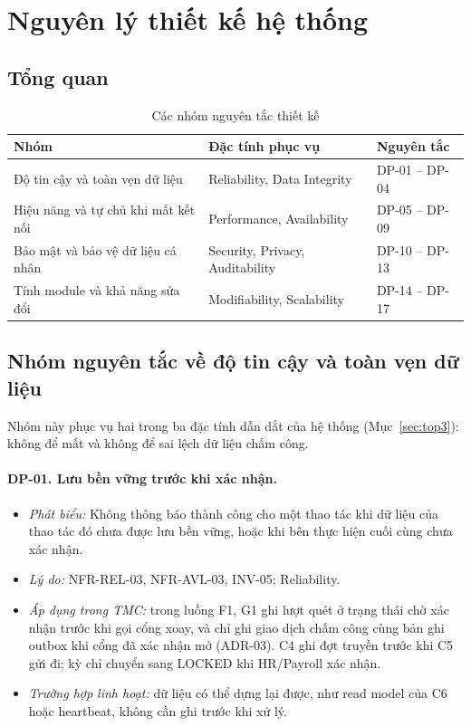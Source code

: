 \section{Nguyên lý thiết kế hệ thống}\label{sec:design-principles}

\subsection{Tổng quan}\label{sec:dp-overview}
\begin{table}[H]
\centering
\caption{Các nhóm nguyên tắc thiết kế}\label{tab:dp-groups}
\small
\renewcommand{\arraystretch}{1.3}
\begin{tabularx}{\textwidth}{|>{\raggedright\arraybackslash}p{4.6cm}|>{\raggedright\arraybackslash}p{3.8cm}|>{\raggedright\arraybackslash}X|}
\hline
\textbf{Nhóm} & \textbf{Đặc tính phục vụ} & \textbf{Nguyên tắc} \\
\hline
Độ tin cậy và toàn vẹn dữ liệu & Reliability, Data Integrity & DP-01 -- DP-04 \\
\hline
Hiệu năng và tự chủ khi mất kết nối & Performance, Availability & DP-05 -- DP-09 \\
\hline
Bảo mật và bảo vệ dữ liệu cá nhân & Security, Privacy, Auditability & DP-10 -- DP-13 \\
\hline
Tính module và khả năng sửa đổi & Modifiability, Scalability & DP-14 -- DP-17 \\
\hline
\end{tabularx}
\end{table}

\subsection{Nhóm nguyên tắc về độ tin cậy và toàn vẹn dữ liệu}\label{sec:dp-reliability}
Nhóm này phục vụ hai trong ba đặc tính dẫn dắt của hệ thống (Mục~\ref{sec:top3}): không để mất và không để sai lệch dữ liệu chấm công.

\paragraph{DP-01. Lưu bền vững trước khi xác nhận.}\label{dp:01}
\begin{itemize}
    \item \textit{Phát biểu:} Không thông báo thành công cho một thao tác khi dữ liệu của thao tác đó chưa được lưu bền vững, hoặc khi bên thực hiện cuối cùng chưa xác nhận.
    \item \textit{Lý do:} NFR-REL-03, NFR-AVL-03, INV-05; Reliability.
    \item \textit{Áp dụng trong TMC:} trong luồng F1, G1 ghi lượt quét ở trạng thái chờ xác nhận trước khi gọi cổng xoay, và chỉ ghi giao dịch chấm công cùng bản ghi outbox khi cổng đã xác nhận mở (ADR-03). C4 ghi đợt truyền trước khi C5 gửi đi; kỳ chỉ chuyển sang LOCKED khi HR/Payroll xác nhận.
    \item \textit{Trường hợp linh hoạt:} dữ liệu có thể dựng lại được, như read model của C6 hoặc heartbeat, không cần ghi trước khi xử lý.
\end{itemize}

